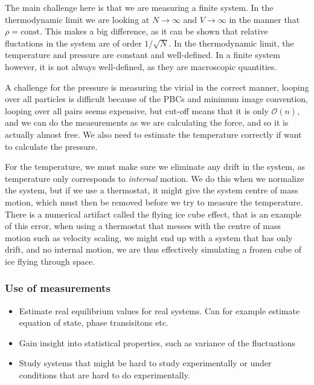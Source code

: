 \documentclass[a4paper, 11pt, notitlepage, english]{article}
\begin{document}
The main challenge here is that we are measuring a finite system. In the thermodynamic limit we are looking at $N\to \infty$ and $V\to \infty$ in the manner that $\rho = \mbox{const}$. This makes a big difference, as it can be shown that relative fluctations in the system are of order $1/\sqrt{N}$. In the thermodynamic limit, the temperature and pressure are constant and well-defined. In a finite system however, it is not always well-defined, as they are macroscopic quantities.

A challenge for the pressure is measuring the virial in the correct manner, looping over all particles is difficult because of the PBCs and minimum image convention, looping over all pairs seems expensive, but cut-off means that it is only $\mathcal{O}(n)$, and we can do the measurements as we are calculating the force, and so it is actually almost free. We also need to estimate the temperature correctly if want to calculate the pressure.

For the temperature, we must make sure we eliminate any drift in the system, as temperature only corresponds to \emph{internal} motion. We do this when we normalize the system, but if we use a thermostat, it might give the system centre of mass motion, which must then be removed before we try to measure the temperature. There is a numerical artifact called the flying ice cube effect, that is an example of this error, when using a thermostat that messes with the centre of mass motion such as velocity scaling, we might end up with a system that has only drift, and no internal motion, we are thus effectively simulating a frozen cube of ice flying through space.

\subsubsection*{Use of measurements}

\begin{itemize}
	\item Estimate real equilibrium values for real systems. Can for example estimate equation of state, phase transisitons etc.
	\item Gain insight into statistical properties, such as variance of the fluctuations
	\item Study systems that might be hard to study experimentally or under conditions that are hard to do experimentally.
\end{itemize}

\clearpage
\end{document}
